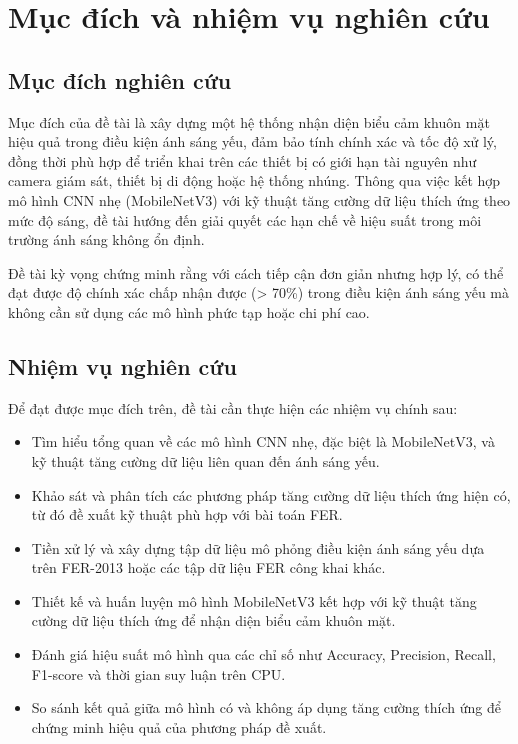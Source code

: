 \section{Mục đích và nhiệm vụ nghiên cứu} %

\subsection{Mục đích nghiên cứu}

Mục đích của đề tài là xây dựng một hệ thống nhận diện biểu cảm khuôn mặt hiệu quả trong điều kiện ánh sáng yếu, đảm bảo tính chính xác và tốc độ xử lý, đồng thời phù hợp để triển khai trên các thiết bị có giới hạn tài nguyên như camera giám sát, thiết bị di động hoặc hệ thống nhúng. Thông qua việc kết hợp mô hình CNN nhẹ (MobileNetV3) với kỹ thuật tăng cường dữ liệu thích ứng theo mức độ sáng, đề tài hướng đến giải quyết các hạn chế về hiệu suất trong môi trường ánh sáng không ổn định.

Đề tài kỳ vọng chứng minh rằng với cách tiếp cận đơn giản nhưng hợp lý, có thể đạt được độ chính xác chấp nhận được (> 70\%) trong điều kiện ánh sáng yếu mà không cần sử dụng các mô hình phức tạp hoặc chi phí cao.

\subsection{Nhiệm vụ nghiên cứu}

Để đạt được mục đích trên, đề tài cần thực hiện các nhiệm vụ chính sau:

\begin{itemize}
    \item Tìm hiểu tổng quan về các mô hình CNN nhẹ, đặc biệt là MobileNetV3, và kỹ thuật tăng cường dữ liệu liên quan đến ánh sáng yếu.
    
    \item Khảo sát và phân tích các phương pháp tăng cường dữ liệu thích ứng hiện có, từ đó đề xuất kỹ thuật phù hợp với bài toán FER.
    
    \item Tiền xử lý và xây dựng tập dữ liệu mô phỏng điều kiện ánh sáng yếu dựa trên FER-2013 hoặc các tập dữ liệu FER công khai khác.
    
    \item Thiết kế và huấn luyện mô hình MobileNetV3 kết hợp với kỹ thuật tăng cường dữ liệu thích ứng để nhận diện biểu cảm khuôn mặt.
    
    \item Đánh giá hiệu suất mô hình qua các chỉ số như Accuracy, Precision, Recall, F1-score và thời gian suy luận trên CPU.
    
    \item So sánh kết quả giữa mô hình có và không áp dụng tăng cường thích ứng để chứng minh hiệu quả của phương pháp đề xuất.
\end{itemize}
